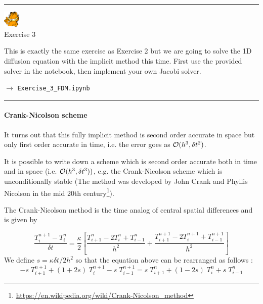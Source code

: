 \begin{center}
\begin{minipage}[t]{0.77\textwidth}
\par\noindent\rule{\textwidth}{0.4pt}

\begin{center}
\includegraphics[width=0.8cm]{images/garftr} \\
{\color{orange}Exercise 3}
\end{center}

This is exactly the same exercise as Exercise 2 but we 
are going to solve the 1D diffusion equation with the implicit method
this time. First use the provided solver in the notebook, then 
implement your own Jacobi solver. 

$\rightarrow$ {\tt Exercise\_3\_FDM.ipynb}

\par\noindent\rule{\textwidth}{0.4pt}
\end{minipage}
\end{center}


\paragraph{Crank-Nicolson scheme} 
It turns out that this fully implicit method is second order accurate in space but 
only first order accurate in time,
i.e. the error goes as ${\cal O}(h^3,\delta t^2)$.   


It is possible to write down a scheme which is second order accurate both in time and in space
(i.e. ${\cal O}(h^3, \delta t^3))$, e.g. the {\color{olive}Crank-Nicolson} scheme 
which is unconditionally stable (The method was developed by John Crank and Phyllis Nicolson 
in the mid 20th century\footnote{\url{https://en.wikipedia.org/wiki/Crank-Nicolson_method}}).

The Crank-Nicolson method is the time analog of central spatial differences and is given by

\[
\frac{T_{i}^{n+1}-T_i^n}{\delta t} 
= \frac{\kappa}{2} \left[
\frac{T_{i+1}^{n} - 2T_i^{n} + T_{i-1}^{n}}{h^2}
+
\frac{T_{i+1}^{n+1} - 2T_i^{n+1} + T_{i-1}^{n+1}}{h^2}
\right]
\]
We define $s=\kappa \delta t/ 2h^2$ so that the equation above can be rearranged as follows :
\[
\boxed{
-s\; T_{i+1}^{n+1} + (1+2s)\;  T_{i}^{n+1} 
-s\;  T_{i-1}^{n+1} = 
s\; T_{i+1}^{n} + (1-2s)\; T_{i}^{n} + s\; T_{i-1}^{n} 
}
\]

